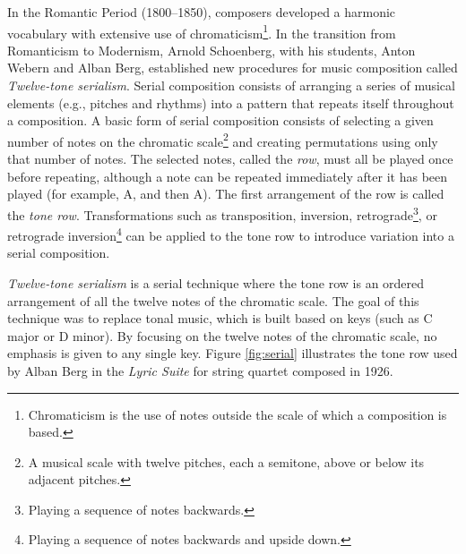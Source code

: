 In the Romantic Period (1800--1850), composers developed a harmonic vocabulary with extensive use of chromaticism\footnote{Chromaticism is the use of notes outside the scale of which a composition is based.}. In the transition from Romanticism to Modernism, Arnold Schoenberg, with his students, Anton Webern and Alban Berg, established new procedures for music composition called \textit{Twelve-tone serialism}. Serial composition consists of arranging a series of musical elements (e.g., pitches and rhythms) into a pattern that repeats itself throughout a composition. A basic form of serial composition consists of selecting a given number of notes on the chromatic scale\footnote{A musical scale with twelve pitches, each a semitone, above or below its adjacent pitches.} and creating permutations using only that number of notes. The selected notes, called the \textit{row}, must all be played once before repeating, although a note can be repeated immediately after it has been played (for example, A, and then A). The first arrangement of the row is called the \textit{tone row}. Transformations such as transposition, inversion, retrograde\footnote{Playing a sequence of notes backwards.}, or retrograde inversion\footnote{Playing a sequence of notes backwards and upside down.} can be applied to the tone row to introduce variation into a serial composition.

\textit{Twelve-tone serialism} is a serial technique where the tone row is an ordered arrangement of all the twelve notes of the chromatic scale. The goal of this technique was to replace tonal music, which is built based on keys (such as C major or D minor). By focusing on the twelve notes of the chromatic scale, no emphasis is given to any single key. Figure \ref{fig:serial} illustrates the tone row used by Alban Berg in the \textit{Lyric Suite} for string quartet composed in 1926.

